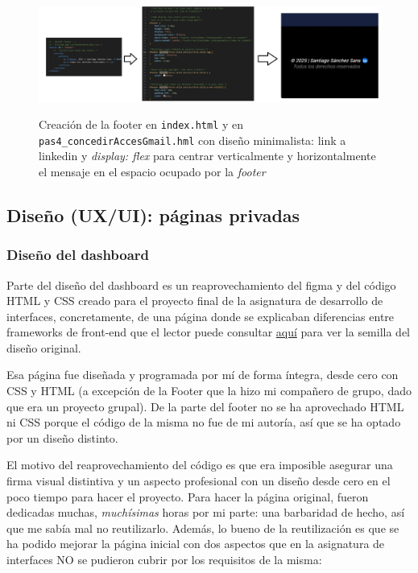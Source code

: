 \documentclass[a4paper,12pt]{report}
\begin{document}
	
	\FloatBarrier
	\setlength{\belowcaptionskip}{3pt}
	\begin{figure}[H]
		\centering
		\caption{Creación de la footer en \texttt{index.html} y en \texttt{pas4\_concedirAccesGmail.hml} con diseño minimalista: link a linkedin y \textit{display: flex} para centrar verticalmente y horizontalmente el mensaje en el espacio ocupado por la \textit{footer}}
		\includegraphics[width=1\linewidth]{img/footerIndexIpas4}
		\label{fig:footerIndexIpas4}
	\end{figure}
	\FloatBarrier
	
	
	
	
	
	
	\subsection{Diseño (UX/UI): páginas privadas}
	\label{sec:disenyoResponsivePrivadas}
	
	\subsubsection{Diseño del dashboard}
	
	Parte del diseño del dashboard es un reaprovechamiento del figma y del código HTML y CSS creado para el proyecto final de la asignatura de desarrollo de interfaces, concretamente, de una página donde se explicaban diferencias entre frameworks de front-end que el lector puede consultar  	\href{https://blackcub3s.github.io/proyectoDesarrolloInterfaces/FrontEnd.html}{aquí} para ver la semilla del diseño original.
	
	Esa página fue diseñada y programada por mí de forma íntegra, desde cero con CSS y HTML (a excepción de la Footer que la hizo mi compañero de grupo, dado que era un proyecto grupal). De la parte del footer no se ha aprovechado HTML ni CSS porque el código de la misma no fue de mi autoría, así que se ha optado por un diseño distinto.
	
	El motivo del reaprovechamiento del código es que era imposible asegurar una firma visual distintiva y un aspecto profesional con un diseño desde cero en el poco tiempo para hacer el proyecto. Para hacer la página original, fueron dedicadas muchas, \textit{muchísimas} horas por mi parte: una barbaridad de hecho, así que me sabía mal no reutilizarlo. Además, lo bueno de la reutilización es que se ha podido mejorar la página inicial con dos aspectos que en la asignatura de interfaces NO se pudieron cubrir por los requisitos de la misma:
	
\end{document}
